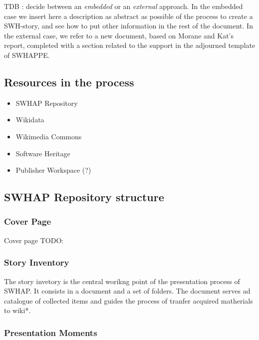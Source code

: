 \documentclass[]{article}
\providecommand{\tightlist}{%
  \setlength{\itemsep}{0pt}\setlength{\parskip}{0pt}}
\begin{document}
TDB : decide between an \emph{embedded} or an \emph{external} approach.
In the embedded case we insert here a description as abstract as
possible of the process to create a SWH-story, and see how to put other
information in the rest of the document. In the external case, we refer
to a new document, based on Morane and Kat's report, completed with a
section related to the support in the adjourned template of SWHAPPE.

\hypertarget{resources-in-the-process}{%
\subsection{Resources in the process}\label{resources-in-the-process}}

\begin{itemize}
\tightlist
\item
  SWHAP Repository
\item
  Wikidata
\item
  Wikimedia Commons
\item
  Software Heritage
\item
  Publisher Workspace (?)
\end{itemize}

\hypertarget{swhap-repository-structure}{%
\subsection{SWHAP Repository
structure}\label{swhap-repository-structure}}

\hypertarget{cover-page}{%
\subsubsection{\texorpdfstring{\textbf{Cover
Page}}{Cover Page}}\label{cover-page}}

Cover page TODO:

\hypertarget{story-inventory}{%
\subsubsection{\texorpdfstring{\textbf{Story
Inventory}}{Story Inventory}}\label{story-inventory}}

The story invetory is the central worikng point of the presentation
process of SWHAP. It consists in a document and a set of folders. The
document serves ad catalogue of collected items and guides the process
of tranfer acquired matherials to wiki*.

\hypertarget{presentation-moments}{%
\subsubsection{\texorpdfstring{\textbf{Presentation
Moments}}{Presentation Moments}}\label{presentation-moments}}
\end{document}
